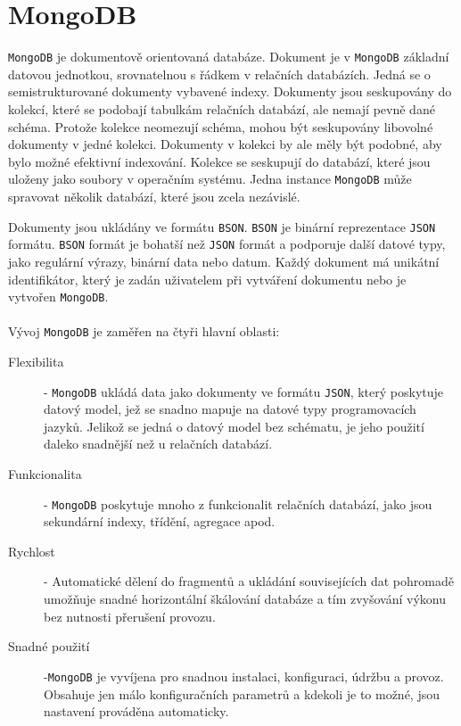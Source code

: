 \documentclass[czech,BP]{thesiskiv}
\begin{document}
		\section{MongoDB}
		
\texttt{MongoDB} je dokumentově orientovaná databáze. Dokument je v \texttt{MongoDB} základní datovou jednotkou, srovnatelnou s řádkem v relačních databázích. Jedná se o semistrukturované dokumenty vybavené indexy. Dokumenty jsou seskupovány do kolekcí, které se podobají tabulkám relačních databází, ale nemají pevně dané schéma. Protože kolekce neomezují schéma, mohou být seskupovány libovolné dokumenty v jedné kolekci. Dokumenty v kolekci by ale měly být podobné, aby bylo možné efektivní indexování. Kolekce se seskupují do databází, které jsou uloženy jako soubory v operačním systému. Jedna instance \texttt{MongoDB} může spravovat několik databází, které jsou zcela nezávislé.\cite{houvzvivcka2012aplikace}

Dokumenty jsou ukládány ve formátu \texttt{BSON}. \texttt{BSON} je binární reprezentace \texttt{JSON} formátu. \texttt{BSON} formát je bohatší než \texttt{JSON} formát a podporuje další datové typy, jako regulární výrazy, binární data nebo datum. Každý dokument má unikátní identifikátor, který je zadán uživatelem při vytváření dokumentu nebo je vytvořen \texttt{MongoDB}.\cite{houvzvivcka2012aplikace}
\\\\
Vývoj \texttt{MongoDB} je zaměřen na čtyři hlavní oblasti:
\begin{description}
\item [Flexibilita]
- \texttt{MongoDB} ukládá data jako dokumenty ve formátu \texttt{JSON}, který poskytuje datový model, jež se snadno mapuje na datové typy programovacích jazyků. Jelikož se jedná o datový model bez schématu, je jeho použití daleko snadnější než u relačních databází.\cite{houvzvivcka2012aplikace}

\item [Funkcionalita] - \texttt{MongoDB} poskytuje mnoho z funkcionalit relačních databází, jako jsou sekundární indexy, třídění, agregace apod.\cite{houvzvivcka2012aplikace}
\item [Rychlost] - Automatické dělení do fragmentů a ukládání souvisejících dat pohromadě umožňuje snadné horizontální škálování databáze a tím zvyšování výkonu bez nutnosti přerušení provozu.\cite{houvzvivcka2012aplikace}
\item [Snadné použití] -\texttt{MongoDB} je vyvíjena pro snadnou instalaci, konfiguraci, údržbu a provoz. Obsahuje jen málo konfiguračních parametrů a kdekoli je to možné, jsou nastavení prováděna automaticky.\cite{houvzvivcka2012aplikace}
\end{description}	
\end{document}
